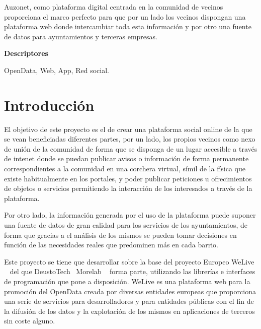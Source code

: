 \documentclass{DeustoFDP}
\begin{document}
Auzonet, como plataforma digital centrada en la comunidad de vecinos proporciona
el marco perfecto para que por un lado los vecinos dispongan una plataforma web
donde intercambiar toda esta información y por otro una fuente de datos para
ayuntamientos y terceras empresas.

\vspace{2em}

{\Large\bfseries\sectionfont Descriptores}
\vspace{3\medskipamount}

OpenData, Web, App, Red social.

\cleardoublepage\tableofcontents
\cleardoublepage\listoffigures
\cleardoublepage\listoftables
\cleardoublepage\listoflistings

\mainmatter
\pagestyle{phdthesis}

\chapter{Introducción}\label{cha:introduccion}
El objetivo de este proyecto es el de crear una plataforma social online de la que se vean beneficiadas diferentes partes, por un lado, los propios vecinos como nexo de unión de la comunidad de forma que se disponga de un lugar accesible a través de intenet donde se puedan publicar avisos o información de forma permanente correspondientes a la comunidad en una corchera virtual, símil de la física que existe habitualmente en los portales, y poder publicar peticiones u ofrecimientos de objetos o servicios permitiendo la interacción de los interesados a través de la plataforma.

Por otro lado, la información generada por el uso de la plataforma puede suponer una fuente de datos de gran calidad para los servicios de los ayuntamientos, de forma que gracias a el análisis de los mismos se pueden tomar decisiones en función de las necesidades reales que predominen más en cada barrio.

Este proyecto se tiene que desarrollar sobre la base del proyecto Europeo WeLive ~\cite{WeLive} del que DeustoTech~\cite{DeustoTech} Morelab ~\cite{Morelab} forma parte, utilizando las librerías e interfaces de programación que pone a disposición. WeLive es una plataforma web para la promoción del OpenData creada por diversas entidades europeas que proporciona una serie de servicios para desarrolladores y para entidades públicas con el fin de la difusión de los datos y la explotación de los mismos en aplicaciones de terceros sin coste alguno.
\end{document}
